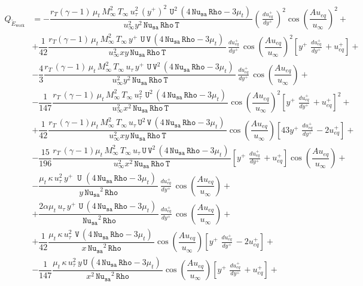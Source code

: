 \documentclass[10pt]{article}
\newcommand{\Rho}{\,\mathtt{Rho}}
\newcommand{\U}{\,\mathtt{U}}
\newcommand{\V}{\,\mathtt{V}}
\newcommand{\Nu}{\,\mathtt{Nu_{sa}}}
\newcommand{\T}{\,\mathtt{T}}
\newcommand{\Dueqplusyplus}{\, \frac{du_{eq}^+}{dy^+}\,}
\newcommand{\tE}{\tilde{E}}
\begin{document}
\begin{equation*}
 \begin{split}
%
Q_{\tE_\text{work}}&=-\dfrac{ r_T(\gamma-1) \,  \mu_t \, M_{\infty}^2 \, T_{\infty} \,  u_{\tau}^2 \, (y^{+})^2 \,  \U^2 \, (4 \Nu \Rho-3 \mu_t) \,}{u_{\infty}^2 y^2 \Nu \Rho \T}    \left(\Dueqplusyplus\right)^2  \cos\left(\dfrac{A u_{eq}}{u_{\infty}}\right)^2+\\
  &+\dfrac{1}{42} \dfrac{ r_T(\gamma-1) \,  \mu_t  \, M_{\infty}^2 \, T_{\infty} \,   y^{+} \, \U \V \, (4 \Nu \Rho-3 \mu_t) \, }{u_{\infty}^2 x y \Nu \Rho \T}  \Dueqplusyplus \cos\left(\dfrac{A u_{eq}}{u_{\infty}}\right)^2 \left[y^{+} \, \Dueqplusyplus+u_{eq}^{+} \right]+\\
  &-\dfrac{4}{3}\dfrac{ r_T \, (\gamma-1) \,  \mu_t \, M_{\infty}^2 \, T_{\infty} \,  u_{\tau} \, y^{+} \, \U \V^2 \, (4 \Nu \Rho-3 \mu_t) \,}{u_{\infty}^2 y^2 \Nu \Rho \T}  \Dueqplusyplus \cos\left(\dfrac{A u_{eq}}{u_{\infty}}\right)+\\
  &-\dfrac{1}{147} \dfrac{r_T \,  (\gamma-1) \,  \mu_t  \, M_{\infty}^2 \, T_{\infty} \,  u_{\tau}^2 \, \U^2 \, (4 \Nu \Rho-3 \mu_t) \,}{u_{\infty}^2 x^2 \Nu \Rho \T} \cos\left(\dfrac{A u_{eq}}{u_{\infty}}\right)^2\left[y^{+} \, \Dueqplusyplus+u_{eq}^{+} \right]^2+\\
  &+\dfrac{1}{42} \dfrac{ r_T \,  (\gamma-1)\mu_t \, M_{\infty}^2 \, T_{\infty} \,  u_{\tau} \U^2 \V\, (4 \Nu \Rho-3 \mu_t) \,}{u_{\infty}^2 x y \Nu \Rho \T} \cos\left(\dfrac{A u_{eq}}{u_{\infty}}\right)\left[43 y^{+} \, \Dueqplusyplus-2 u_{eq}^{+}\right]+\\
  &-\dfrac{15}{196} \dfrac{r_T \, (\gamma-1)\mu_t \, M_{\infty}^2 \, T_{\infty} \,  u_{\tau} \U \V^2 \, (4 \Nu \Rho-3 \mu_t) \,}{u_{\infty}^2 x^2 \Nu \Rho \T}  \left[y^{+} \, \Dueqplusyplus+u_{eq}^{+} \right] \cos\left(\dfrac{A u_{eq}}{u_{\infty}}\right)+\\
  &-\dfrac{\mu_t \, \kappa \,   u_{\tau}^2 \, y^{+} \, \, \U \,\, (4 \Nu \Rho-3 \mu_t) \,}{y \Nu^2 \Rho} \Dueqplusyplus \cos\left(\dfrac{A u_{eq}}{u_{\infty}}\right)+\\
  &+\dfrac{2  \alpha \mu_t \,  u_{\tau} \,  y^{+} \, \U \, (4 \Nu \Rho-3 \mu_t) \,}{\Nu^2 \Rho} \Dueqplusyplus \cos\left(\dfrac{A u_{eq}}{u_{\infty}}\right)+\\
  &+\dfrac{1}{42} \dfrac{\mu_t \, \kappa \,  u_{\tau}^2 \, \V \, (4 \Nu \Rho-3 \mu_t) \,}{x \Nu^2 \Rho} \cos\left(\dfrac{A u_{eq}}{u_{\infty}}\right)\left[y^{+} \, \Dueqplusyplus-2 u_{eq}^{+}\right] +\\
  &-\dfrac{1}{147} \dfrac{   \mu_t \, \kappa \,  u_{\tau}^2 \, y \U \, (4 \Nu \Rho-3 \mu_t) \,}{x^2 \Nu^2 \Rho}\cos\left(\dfrac{A u_{eq}}{u_{\infty}}\right)\left[y^{+} \, \Dueqplusyplus+u_{eq}^{+} \right]+\\

\end{split}
\end{equation*}
\end{document}
